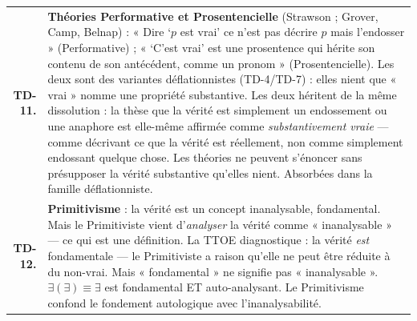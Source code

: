 \documentclass[10pt, openany, oneside]{book}
\begin{document}
{\begin{tabular}{r p{}}
\textbf{TD-11.} & \textbf{Théories Performative et Prosentencielle} (Strawson ; Grover, Camp, Belnap) : « Dire `$p$ est vrai' ce n'est pas décrire $p$ mais l'endosser » (Performative) ; « `C'est vrai' est une prosentence qui hérite son contenu de son antécédent, comme un pronom » (Prosentencielle). Les deux sont des variantes déflationnistes (TD-4/TD-7) : elles nient que « vrai » nomme une propriété substantive. Les deux héritent de la même dissolution : la thèse que la vérité est simplement un endossement ou une anaphore est elle-même affirmée comme \textit{substantivement vraie} --- comme décrivant ce que la vérité est réellement, non comme simplement endossant quelque chose. Les théories ne peuvent s'énoncer sans présupposer la vérité substantive qu'elles nient. Absorbées dans la famille déflationniste. \\[0.3em]
\textbf{TD-12.} & \textbf{Primitivisme} : la vérité est un concept inanalysable, fondamental. Mais le Primitiviste vient d'\textit{analyser} la vérité comme « inanalysable » --- ce qui est une définition. La TTOE diagnostique : la vérité \textit{est} fondamentale --- le Primitiviste a raison qu'elle ne peut être réduite à du non-vrai. Mais « fondamental » ne signifie pas « inanalysable ». $\exists(\exists) \equiv \exists$ est fondamental ET auto-analysant. Le Primitivisme confond le fondement autologique avec l'inanalysabilité. \\[0.3em]

\end{tabular}}
\end{document}
